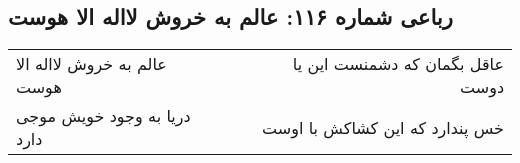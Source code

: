 \begin{center}
\section*{رباعی شماره ۱۱۶: عالم به خروش لااله الا هوست}
\label{sec:sh116}
\begin{longtable}{l p{0.5cm} r}
عالم به خروش لااله الا هوست
&&
عاقل بگمان که دشمنست این یا دوست
\\
دریا به وجود خویش موجی دارد
&&
خس پندارد که این کشاکش با اوست
\\
\end{longtable}
\end{center}
